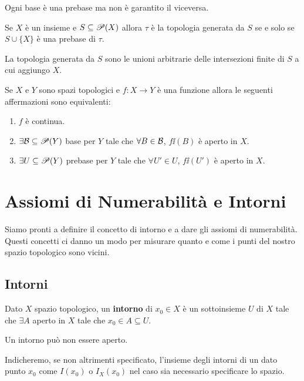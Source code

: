 \begin{multicols*}{2}
\begin{remark}
Ogni base è una prebase ma non è garantito il viceversa.
\end{remark}

\begin{theorem}
Se $X$ è un insieme e $S\subseteq\mathscr{P}(X)$ allora $\tau$ è la topologia generata da $S$ se e solo se $S\cup\{X\}$ è una prebase di $\tau$.
\end{theorem}

\begin{remark}
La topologia generata da $S$ sono le unioni arbitrarie delle intersezioni finite di $S$ a cui aggiungo $X$.
\end{remark}

\begin{proposition}
Se $X$ e $Y$ sono spazi topologici e $f:X\to Y$ è una funzione allora le seguenti affermazioni sono equivalenti:
\begin{enumerate}[noitemsep]
\item $f$ è continua.
\item $\exists \mathcal{B}\subseteq \mathscr{P}(Y)$ base per $Y$ tale che $\forall B\in \mathcal{B}$, $f\ii(B)$ è aperto in $X$.
\item $\exists U\subseteq \mathscr{P}(Y)$ prebase per $Y$ tale che $\forall U'\in U$, $f\ii(U')$ è aperto in $X$.
\end{enumerate}
\end{proposition}

\section{Assiomi di Numerabilità e Intorni}
Siamo pronti a definire il concetto di intorno e a dare gli assiomi di numerabilità. Questi concetti ci danno un modo per misurare quanto e come i punti del nostro spazio topologico sono vicini.


\subsection{Intorni}
\begin{definition}[Intorno]
Dato $X$ spazio topologico, un \textbf{intorno} di $x_0\in X$ è un sottoinsieme $U$ di $X$ tale che $\exists A$ aperto in $X$ tale che $x_0\in A\subseteq U$.
\end{definition}
\begin{remark}
Un intorno può non essere aperto.
\end{remark}
\begin{notation}
Indicheremo, se non altrimenti specificato, l'insieme degli intorni di un dato punto $x_0$ come $I(x_0)$ o $I_X(x_0)$ nel caso sia necessario specificare lo spazio.
\end{notation}



\end{multicols*}
